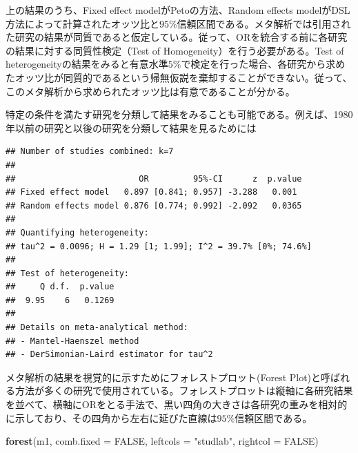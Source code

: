 \documentclass[]{article}
\newenvironment{Shaded}{\begin{snugshade}}{\end{snugshade}}
\newcommand{\KeywordTok}[1]{\textcolor[rgb]{0.13,0.29,0.53}{\textbf{{#1}}}}
\newcommand{\DataTypeTok}[1]{\textcolor[rgb]{0.13,0.29,0.53}{{#1}}}
\newcommand{\DecValTok}[1]{\textcolor[rgb]{0.00,0.00,0.81}{{#1}}}
\newcommand{\StringTok}[1]{\textcolor[rgb]{0.31,0.60,0.02}{{#1}}}
\newcommand{\OtherTok}[1]{\textcolor[rgb]{0.56,0.35,0.01}{{#1}}}
\newcommand{\NormalTok}[1]{{#1}}
\begin{document}
上の結果のうち、Fixed effect modelがPetoの方法、Random effects
modelがDSL方法によって計算されたオッツ比と$95\%$信頼区間である。メタ解析では引用された研究の結果が同質であると仮定している。従って、ORを統合する前に各研究の結果に対する同質性検定（Test
of Homogeneity）を行う必要がある。Test of
heterogeneityの結果をみると有意水準$5\%$で検定を行った場合、各研究から求めたオッツ比が同質的であるという帰無仮説を棄却することができない。従って、このメタ解析から求められたオッツ比は有意であることが分かる。

特定の条件を満たす研究を分類して結果をみることも可能である。例えば、1980年以前の研究と以後の研究を分類して結果を見るためには

\begin{Shaded}
\end{Shaded}

\begin{verbatim}
## Number of studies combined: k=7
## 
##                         OR         95%-CI      z  p.value
## Fixed effect model   0.897 [0.841; 0.957] -3.288   0.001 
## Random effects model 0.876 [0.774; 0.992] -2.092   0.0365
## 
## Quantifying heterogeneity:
## tau^2 = 0.0096; H = 1.29 [1; 1.99]; I^2 = 39.7% [0%; 74.6%]
## 
## Test of heterogeneity:
##     Q d.f.  p.value
##  9.95    6   0.1269
## 
## Details on meta-analytical method:
## - Mantel-Haenszel method
## - DerSimonian-Laird estimator for tau^2
\end{verbatim}

メタ解析の結果を視覚的に示すためにフォレストプロット(Forest
Plot)と呼ばれる方法が多くの研究で使用されている。フォレストプロットは縦軸に各研究結果を並べて、横軸にORをとる手法で、黒い四角の大きさは各研究の重みを相対的に示しており、その四角から左右に延びた直線は$95\%$信頼区間である。

\begin{Shaded}
\begin{Highlighting}[]
\KeywordTok{forest}\NormalTok{(m1, }\DataTypeTok{comb.fixed =} \OtherTok{FALSE}\NormalTok{, }\DataTypeTok{leftcols =} \StringTok{"studlab"}\NormalTok{, }\DataTypeTok{rightcol =} \OtherTok{FALSE}\NormalTok{)}
\end{Highlighting}
\end{Shaded}
\end{document}
